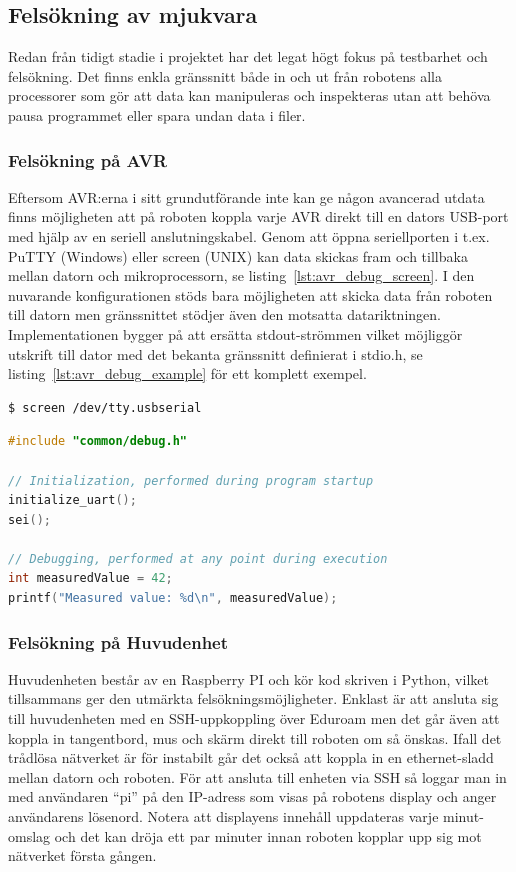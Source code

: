\documentclass{article}
\begin{document}
\subsection{Felsökning av mjukvara}
Redan från tidigt stadie i projektet har det legat högt fokus på testbarhet och felsökning. Det finns enkla gränssnitt både in och ut från robotens alla processorer som gör att data kan manipuleras och inspekteras utan att behöva pausa programmet eller spara undan data i filer.

\subsubsection{Felsökning på AVR}
Eftersom AVR:erna i sitt grundutförande inte kan ge någon avancerad utdata finns möjligheten att på roboten koppla varje AVR direkt till en dators USB-port med hjälp av en seriell anslutningskabel. Genom att öppna seriellporten i t.ex. PuTTY (Windows) eller screen (UNIX) kan data skickas fram och tillbaka mellan datorn och mikroprocessorn, se listing~\ref{lst:avr_debug_screen}. I den nuvarande konfigurationen stöds bara möjligheten att skicka data från roboten till datorn men gränssnittet stödjer även den motsatta datariktningen. Implementationen bygger på att ersätta stdout-strömmen vilket möjliggör utskrift till dator med det bekanta gränssnitt definierat i stdio.h, se listing~\ref{lst:avr_debug_example} för ett komplett exempel.
\newline
\begin{lstlisting}[language=sh, label={lst:avr_debug_screen}, caption={Anslutning via screen}]
$ screen /dev/tty.usbserial
\end{lstlisting}

\begin{lstlisting}[language=C, label={lst:avr_debug_example}, caption=Exempel av utskrift]
#include "common/debug.h"

// Initialization, performed during program startup
initialize_uart();
sei();

// Debugging, performed at any point during execution
int measuredValue = 42;
printf("Measured value: %d\n", measuredValue);
\end{lstlisting}

\subsubsection{Felsökning på Huvudenhet}
Huvudenheten består av en Raspberry PI och kör kod skriven i Python, vilket tillsammans ger den utmärkta felsökningsmöjligheter. Enklast är att ansluta sig till huvudenheten med en SSH-uppkoppling över Eduroam men det går även att koppla in tangentbord, mus och skärm direkt till roboten om så önskas. Ifall det trådlösa nätverket är för instabilt går det också att koppla in en ethernet-sladd mellan datorn och roboten. För att ansluta till enheten via SSH så loggar man in med användaren ``pi'' på den IP-adress som visas på robotens display och anger användarens lösenord. Notera att displayens innehåll uppdateras varje minut-omslag och det kan dröja ett par minuter innan roboten kopplar upp sig mot nätverket första gången.
\end{document}
